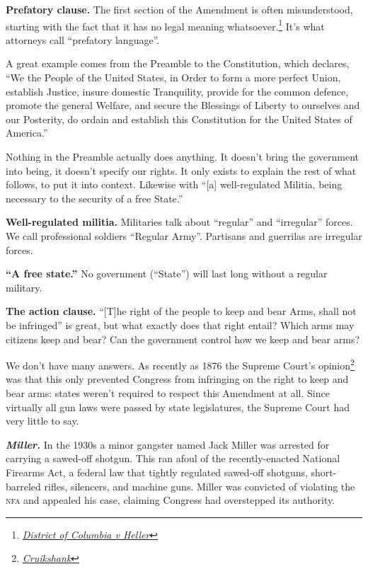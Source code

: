 \documentclass[10pt]{article}
\begin{document}
{\bf Prefatory clause.}  The first section of the Amendment is often misunderstood, starting with the fact that it has no legal meaning whatsoever.\footnote{\href{https://scholar.google.com/scholar_case?case=6484080926445491577}{\it District of Columbia v Heller}}  It's what attorneys call ``prefatory language''. 

A great example comes from the Preamble to the Constitution, which declares, ``We the People of the United States, in Order to form a more perfect Union, establish Justice, insure domestic Tranquility, provide for the common defence, promote the general Welfare, and secure the Blessings of Liberty to ourselves and our Posterity, do ordain and establish this Constitution for the United States of America.''

Nothing in the Preamble actually does anything.  It doesn't bring the government into being, it doesn't specify our rights.  It only exists to explain the rest of what follows, to put it into context.  Likewise with ``[a] well-regulated Militia, being necessary to the security of a free State.''

{\bf Well-regulated militia.}  Militaries talk about ``regular'' and ``irregular'' forces.  We call professional soldiers ``Regular Army''.  Partisans and guerrilas are irregular forces.

{\bf ``A free state.''} No government (``State'') will last long without a regular military.

{\bf The action clause.}  ``[T]he right of the people to keep and bear Arms, shall not be infringed'' is great, but what exactly does that right entail?  Which arms may citizens keep and bear?  Can the government control how we keep and bear arms?

We don't have many answers.  As recently as 1876 the Supreme Court's opinion\footnote{\href{https://tile.loc.gov/storage-services/service/ll/usrep/usrep092/usrep092542/usrep092542.pdf}{\it Cruikshank}} was that this only prevented Congress from infringing on the right to keep and bear arms: states weren't required to respect this Amendment at all.  Since virtually all gun laws were passed by state legislatures, the Supreme Court had very little to say.

\vspace{0.5cm}

\textbf{\textit{Miller.}}  In the 1930s a minor gangster named Jack Miller was arrested for carrying a sawed-off shotgun.  This ran afoul of the recently-enacted National Firearms Act, a federal law that tightly regulated sawed-off shotguns, short-barreled rifles, silencers, and machine guns.  Miller was convicted of violating the \textsc{nfa} and appealed his case, claiming Congress had overstepped its authority.
\end{document}
